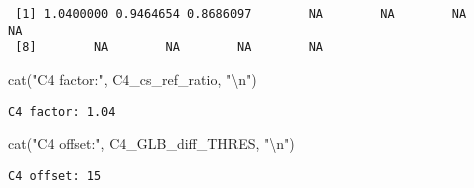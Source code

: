 \documentclass[
  10pt,
  a4paper,oneside]{article}
\newenvironment{Shaded}{\begin{snugshade}}{\end{snugshade}}
\newcommand{\FunctionTok}[1]{\textcolor[rgb]{0.00,0.00,0.00}{#1}}
\newcommand{\NormalTok}[1]{#1}
\newcommand{\SpecialCharTok}[1]{\textcolor[rgb]{0.00,0.00,0.00}{#1}}
\newcommand{\StringTok}[1]{\textcolor[rgb]{0.31,0.60,0.02}{#1}}
\begin{document}
\begin{verbatim}
 [1] 1.0400000 0.9464654 0.8686097        NA        NA        NA        NA
 [8]        NA        NA        NA        NA
\end{verbatim}

\begin{Shaded}
\begin{Highlighting}[]
\FunctionTok{cat}\NormalTok{(}\StringTok{"C4 factor:"}\NormalTok{, C4\_cs\_ref\_ratio,   }\StringTok{"}\SpecialCharTok{\textbackslash{}n}\StringTok{"}\NormalTok{)}
\end{Highlighting}
\end{Shaded}

\begin{verbatim}
C4 factor: 1.04 
\end{verbatim}

\begin{Shaded}
\begin{Highlighting}[]
\FunctionTok{cat}\NormalTok{(}\StringTok{"C4 offset:"}\NormalTok{, C4\_GLB\_diff\_THRES, }\StringTok{"}\SpecialCharTok{\textbackslash{}n}\StringTok{"}\NormalTok{)}
\end{Highlighting}
\end{Shaded}

\begin{verbatim}
C4 offset: 15 
\end{verbatim}
\end{document}
